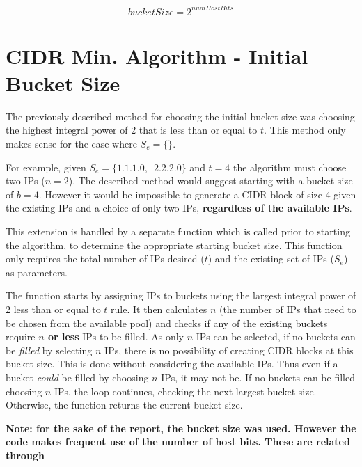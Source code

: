 \begin{appendices}
\begin{equation}\label{eq:bucketSizeHostBits}
bucketSize = 2^{numHostBits}
\end{equation}
\vfill




\chapter{CIDR Min. Algorithm - Initial Bucket Size}
\label{appendix:smartInitBucket}
The previously described method for choosing the initial bucket size was choosing the highest integral power of 2 that is less than or equal to $t$. This method only makes sense for the case where $S_e = \{\}$. 

For example, given $S_e = \{1.1.1.0,\enspace2.2.2.0\}$ and $t = 4$ the algorithm must choose two IPs ($n = 2$). The described method would suggest starting with a bucket size of $b=4$. However it would be impossible to generate a CIDR block of size 4 given the existing IPs and a choice of only two IPs, \textbf{regardless of the available IPs}. 

This extension is handled by a separate function which is called prior to starting the algorithm, to determine the appropriate starting bucket size. This function only requires the total number of IPs desired ($t$) and the existing set of IPs ($S_e$) as parameters. 

The function starts by assigning IPs to buckets using the largest integral power of 2 less than or equal to $t$ rule. It then calculates $n$ (the number of IPs that need to be chosen from the available pool) and checks if any of the existing buckets require \textbf{$n$ or less} IPs to be filled. As only $n$ IPs can be selected, if no buckets can be \textit{filled} by selecting $n$ IPs, there is no possibility of creating CIDR blocks at this bucket size. This is done without considering the available IPs. Thus even if a bucket \textit{could} be filled by choosing $n$ IPs, it may not be. If no buckets can be filled choosing $n$ IPs, the loop continues, checking the next largest bucket size. Otherwise, the function returns the current bucket size.

\textbf{Note: for the sake of the report, the bucket size was used. However the code makes frequent use of the number of host bits. These are related through }


\end{appendices}
